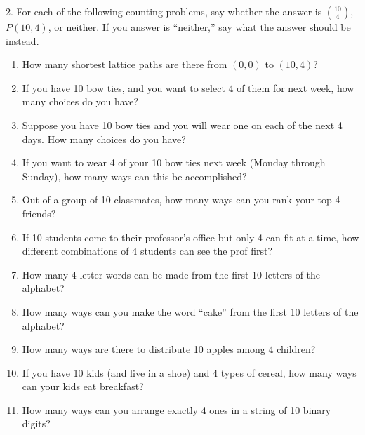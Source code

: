 \documentclass[10pt,]{book}
\theoremstyle{plain}
\theoremstyle{definition}
\numberwithin{equation}{chapter}
\begin{document}
\begin{exerciselist}
\par\smallskip
\item[2.]\hypertarget{exercise-121}{}
            For each of the following counting problems, say whether the answer is \({10\choose 4}\), \(P(10,4)\), or neither.
            If you answer is ``neither,'' say what the answer should be instead.
          \leavevmode%
\begin{enumerate}[label=(\alph*)]
\item\hypertarget{li-374}{}
                How many shortest lattice paths are there from \((0,0)\) to \((10,4)\)?
\item\hypertarget{li-375}{}
                If you have 10 bow ties, and you want to select 4 of them for next week, how many choices do you have?
\item\hypertarget{li-376}{}
                Suppose you have 10 bow ties and you will wear one on each of the next 4 days. How many choices do you have?
\item\hypertarget{li-377}{}
                If you want to wear 4 of your 10 bow ties next week (Monday through Sunday), how many ways can this be accomplished?
\item\hypertarget{li-378}{}
                Out of a group of 10 classmates, how many ways can you rank your top 4 friends?
\item\hypertarget{li-379}{}
                If 10 students come to their professor's office but only 4 can fit at a time, how different combinations of 4 students can see the prof first?
\item\hypertarget{li-380}{}
                How many 4 letter words can be made from the first 10 letters of the alphabet?
\item\hypertarget{li-381}{}
                How many ways can you make the word ``cake'' from the first 10 letters of the alphabet?
\item\hypertarget{li-382}{}
                How many ways are there to distribute 10 apples among 4 children?
\item\hypertarget{li-383}{}
                If you have 10 kids (and live in a shoe) and 4 types of cereal, how many ways can your kids eat breakfast?
\item\hypertarget{li-384}{}
                How many ways can you arrange exactly 4 ones in a string of 10 binary digits?

\end{enumerate}
\end{exerciselist}
\end{document}
